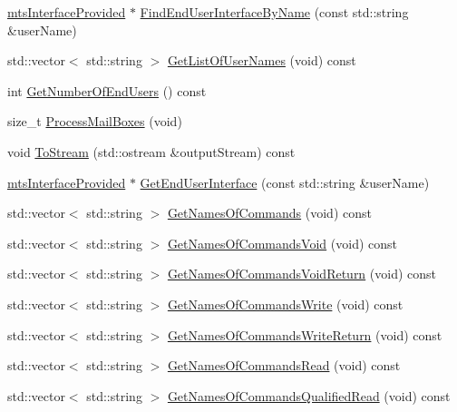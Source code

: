 \begin{DoxyCompactItemize}
\hyperlink{classmts_interface_provided}{mts\-Interface\-Provided} $\ast$ \hyperlink{classmts_interface_provided_abdddea75fe9d92f053c74fd0ce0acdd4}{Find\-End\-User\-Interface\-By\-Name} (const std\-::string \&user\-Name)
\item 
std\-::vector$<$ std\-::string $>$ \hyperlink{classmts_interface_provided_a277162b8ba56c13c974e9b59b5d6ca58}{Get\-List\-Of\-User\-Names} (void) const 
\item 
int \hyperlink{classmts_interface_provided_ac3c1b57073e0c3a0981f61f0f4391599}{Get\-Number\-Of\-End\-Users} () const 
\item 
size\-\_\-t \hyperlink{classmts_interface_provided_a0b0b7739f1b469b141e20eb46d1f3344}{Process\-Mail\-Boxes} (void)
\item 
void \hyperlink{classmts_interface_provided_a6887772d5f2b4846473f534b81a3eb5e}{To\-Stream} (std\-::ostream \&output\-Stream) const 
\item 
\hyperlink{classmts_interface_provided}{mts\-Interface\-Provided} $\ast$ \hyperlink{classmts_interface_provided_ac1300453ce7e30f5d6d98e4a588d3eb5}{Get\-End\-User\-Interface} (const std\-::string \&user\-Name)
\end{DoxyCompactItemize}
{\bf }\par
\begin{DoxyCompactItemize}
\item 
std\-::vector$<$ std\-::string $>$ \hyperlink{classmts_interface_provided_a51c476d0f40473d84ace9b164083b288}{Get\-Names\-Of\-Commands} (void) const 
\item 
std\-::vector$<$ std\-::string $>$ \hyperlink{classmts_interface_provided_a8a82481c9df782ff6dd21cdc55be4659}{Get\-Names\-Of\-Commands\-Void} (void) const 
\item 
std\-::vector$<$ std\-::string $>$ \hyperlink{classmts_interface_provided_a74fd81b8b2a63ae837c240883bcb6b1a}{Get\-Names\-Of\-Commands\-Void\-Return} (void) const 
\item 
std\-::vector$<$ std\-::string $>$ \hyperlink{classmts_interface_provided_ab439de7675785bf43a3286cb4f9a5521}{Get\-Names\-Of\-Commands\-Write} (void) const 
\item 
std\-::vector$<$ std\-::string $>$ \hyperlink{classmts_interface_provided_a3bb0d6c7eec56c275ad2958f68d6af1a}{Get\-Names\-Of\-Commands\-Write\-Return} (void) const 
\item 
std\-::vector$<$ std\-::string $>$ \hyperlink{classmts_interface_provided_a58a05b294fc5a89120d89191e7eb9a6b}{Get\-Names\-Of\-Commands\-Read} (void) const 
\item 
std\-::vector$<$ std\-::string $>$ \hyperlink{classmts_interface_provided_afc65a53da89134270337069444e563f5}{Get\-Names\-Of\-Commands\-Qualified\-Read} (void) const 
\end{DoxyCompactItemize}

